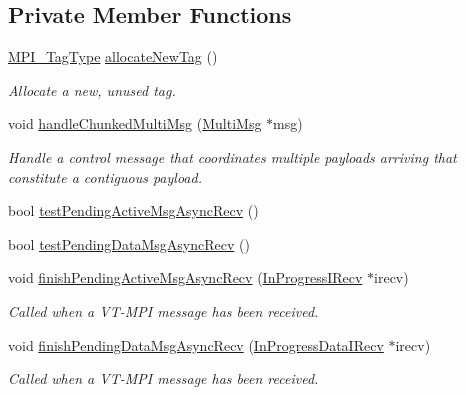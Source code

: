 \subsection*{Private Member Functions}
\begin{DoxyCompactItemize}
\item 
\hyperlink{namespacevt_1_1messaging_af700cb74b7b97c1a305267a9eb3ba91a}{M\+P\+I\+\_\+\+Tag\+Type} \hyperlink{structvt_1_1messaging_1_1_active_messenger_af2339f3300276bdc7e55706ce0cfff2a}{allocate\+New\+Tag} ()
\begin{DoxyCompactList}\small\item\em Allocate a new, unused tag. \end{DoxyCompactList}\item 
void \hyperlink{structvt_1_1messaging_1_1_active_messenger_a3ec09d3c055bee21bfd3d55a9c500b39}{handle\+Chunked\+Multi\+Msg} (\hyperlink{structvt_1_1messaging_1_1_multi_msg}{Multi\+Msg} $\ast$msg)
\begin{DoxyCompactList}\small\item\em Handle a control message that coordinates multiple payloads arriving that constitute a contiguous payload. \end{DoxyCompactList}\item 
bool \hyperlink{structvt_1_1messaging_1_1_active_messenger_a12133fda914a7809ac7ce7694efc312e}{test\+Pending\+Active\+Msg\+Async\+Recv} ()
\item 
bool \hyperlink{structvt_1_1messaging_1_1_active_messenger_ae8e94c46cd2948864a97a671428b64bc}{test\+Pending\+Data\+Msg\+Async\+Recv} ()
\item 
void \hyperlink{structvt_1_1messaging_1_1_active_messenger_a162667e5566546402f12baf8cf60d4da}{finish\+Pending\+Active\+Msg\+Async\+Recv} (\hyperlink{structvt_1_1messaging_1_1_in_progress_i_recv}{In\+Progress\+I\+Recv} $\ast$irecv)
\begin{DoxyCompactList}\small\item\em Called when a V\+T-\/\+M\+PI message has been received. \end{DoxyCompactList}\item 
void \hyperlink{structvt_1_1messaging_1_1_active_messenger_a80a13017308870133ff8538741bee394}{finish\+Pending\+Data\+Msg\+Async\+Recv} (\hyperlink{structvt_1_1messaging_1_1_in_progress_data_i_recv}{In\+Progress\+Data\+I\+Recv} $\ast$irecv)
\begin{DoxyCompactList}\small\item\em Called when a V\+T-\/\+M\+PI message has been received. \end{DoxyCompactList}\item 

\end{DoxyCompactItemize}
